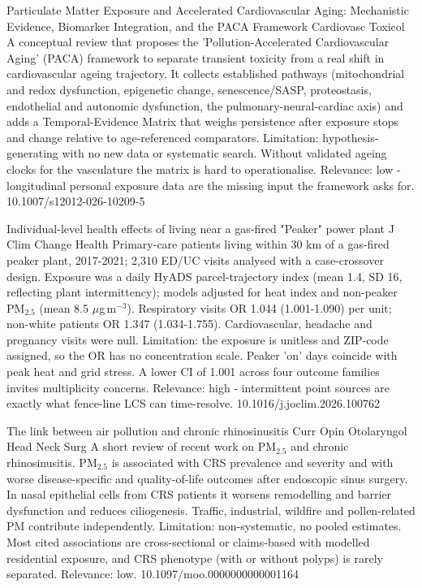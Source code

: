 \documentclass[10pt]{article}
\begin{document}
{Particulate Matter Exposure and Accelerated Cardiovascular Aging: Mechanistic Evidence, Biomarker Integration, and the PACA Framework}
{Cardiovasc Toxicol}
{A conceptual review that proposes the 'Pollution-Accelerated Cardiovascular Aging' (PACA) framework to separate transient toxicity from a real shift in cardiovascular ageing trajectory. It collects established pathways (mitochondrial and redox dysfunction, epigenetic change, senescence/SASP, proteostasis, endothelial and autonomic dysfunction, the pulmonary-neural-cardiac axis) and adds a Temporal-Evidence Matrix that weighs persistence after exposure stops and change relative to age-referenced comparators. Limitation: hypothesis-generating with no new data or systematic search. Without validated ageing clocks for the vasculature the matrix is hard to operationalise. Relevance: low - longitudinal personal exposure data are the missing input the framework asks for.}
{10.1007/s12012-026-10209-5}

\par{}\baselineskip{}\baselineskip
{}

{Individual-level health effects of living near a gas-fired "Peaker" power plant}
{J Clim Change Health}
{Primary-care patients living within 30 km of a gas-fired peaker plant, 2017-2021; 2,310 ED/UC visits analysed with a case-crossover design. Exposure was a daily HyADS parcel-trajectory index (mean 1.4, SD 16, reflecting plant intermittency); models adjusted for heat index and non-peaker PM$_{2.5}$ (mean 8.5 $\mu$g\,m$^{-3}$). Respiratory visits OR 1.044 (1.001-1.090) per unit; non-white patients OR 1.347 (1.034-1.755). Cardiovascular, headache and pregnancy visits were null. Limitation: the exposure is unitless and ZIP-code assigned, so the OR has no concentration scale. Peaker 'on' days coincide with peak heat and grid stress. A lower CI of 1.001 across four outcome families invites multiplicity concerns. Relevance: high - intermittent point sources are exactly what fence-line LCS can time-resolve.}
{10.1016/j.joclim.2026.100762}

{The link between air pollution and chronic rhinosinusitis}
{Curr Opin Otolaryngol Head Neck Surg}
{A short review of recent work on PM$_{2.5}$ and chronic rhinosinusitis. PM$_{2.5}$ is associated with CRS prevalence and severity and with worse disease-specific and quality-of-life outcomes after endoscopic sinus surgery. In nasal epithelial cells from CRS patients it worsens remodelling and barrier dysfunction and reduces ciliogenesis. Traffic, industrial, wildfire and pollen-related PM contribute independently. Limitation: non-systematic, no pooled estimates. Most cited associations are cross-sectional or claims-based with modelled residential exposure, and CRS phenotype (with or without polyps) is rarely separated. Relevance: low.}
{10.1097/moo.0000000000001164}
\end{document}
